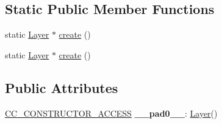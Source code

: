 \subsection*{Static Public Member Functions}
\begin{DoxyCompactItemize}
\item 
static \hyperlink{classLayer}{Layer} $\ast$ \hyperlink{classLayer_a779e4a3b9a3b2218a972b84f77a7ca04}{create} ()
\item 
static \hyperlink{classLayer}{Layer} $\ast$ \hyperlink{classLayer_a53a8d19f9f175f842a3316196b664d1e}{create} ()
\end{DoxyCompactItemize}
\subsection*{Public Attributes}
\begin{DoxyCompactItemize}
\item 
\mbox{\label{classLayer_a6e33d5706a5a673ded7d4ad28cddb3d8}} 
\hyperlink{_2cocos2d_2cocos_2base_2ccConfig_8h_a25ef1314f97c35a2ed3d029b0ead6da0}{C\+C\+\_\+\+C\+O\+N\+S\+T\+R\+U\+C\+T\+O\+R\+\_\+\+A\+C\+C\+E\+SS} {\bfseries \+\_\+\+\_\+pad0\+\_\+\+\_\+}\+: \hyperlink{classLayer}{Layer}()
\end{DoxyCompactItemize}
